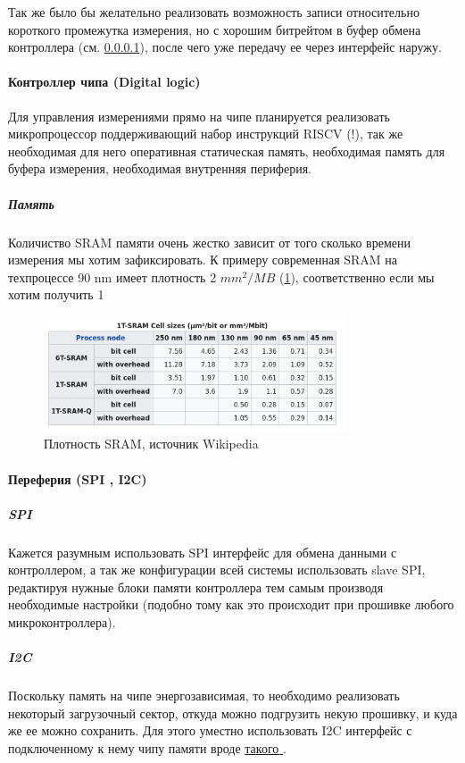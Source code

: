 \documentclass[a4paper,12pt]{article} %
\newcommand{\link}[2]{\underline{\href{#1}{#2} }}
\begin{document}
Так же было бы желательно реализовать возможность записи относительно короткого промежутка измерения, но с хорошим битрейтом в буфер обмена контроллера (см. \ref{digital}), после чего уже передачу ее через интерфейс наружу.

\paragraph{ Контроллер чипа (Digital logic)} \label{digital}

Для управления измерениями прямо на чипе планируется реализовать микропроцессор поддерживающий набор инструкций RISCV (!), так же необходимая для него оперативная статическая память, необходимая память для буфера измерения, необходимая внутренняя периферия.

\subparagraph{Память} Количиство SRAM памяти очень жестко зависит от того сколько времени измерения мы хотим зафиксировать. К примеру современная SRAM на техпроцессе 90 nm имеет плотность 2 $mm^2/MB $ (\ref{pic:sram}), соответственно если мы хотим получить 1 

\begin{figure}[h]
\centering
\includegraphics[width=0.8\textwidth]{sram.png}
\caption{ Плотность SRAM, источник Wikipedia}\label{pic:sram}
\end{figure}



\paragraph{ Переферия  (SPI , I2C)}

\subparagraph{SPI} Кажется разумным использовать SPI интерфейс для обмена данными с контроллером, а так же конфигурации всей системы использовать slave SPI, редактируя нужные блоки памяти контроллера тем самым производя необходимые настройки (подобно тому как это происходит при прошивке любого микроконтроллера).

\subparagraph{I2C}

Поскольку память на чипе энергозависимая, то необходимо реализовать некоторый загрузочный сектор, откуда можно подгрузить некую прошивку, и куда же ее можно сохранить. Для этого уместно использовать I2C интерфейс с подключенному к нему чипу  памяти вроде \link{https://www.fujitsu.com/downloads/MICRO/fsa/pdf/products/memory/fram/MB85RC64A-DS501-00019-2v0-E.pdf}{такого}.
\end{document}
